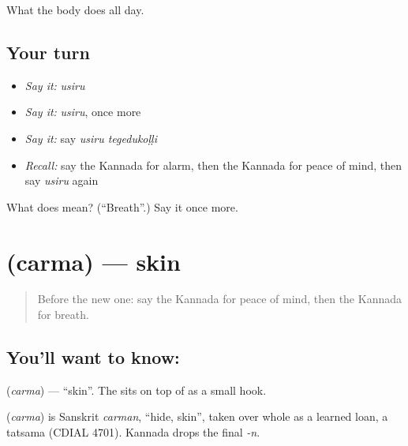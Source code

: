 \begin{grammarlens}[title={What you've built}]
What the body does all day.
\end{grammarlens}

\subsection*{Your turn}
\begin{itemize}
\raggedright
  \item \emph{Say it:} \emph{usiru}
  \item \emph{Say it:} \emph{usiru}, once more
  \item \emph{Say it:} say \emph{usiru tegedukoḷḷi}
  \item \emph{Recall:} say the Kannada for alarm, then the Kannada for peace of mind, then say \emph{usiru} again
\end{itemize}

\begin{tcolorbox}[breakable,colback=teal!4,colframe=teal!35!black,title={Before you move on}]
What does  mean? (\textquotedblleft{}Breath\textquotedblright{}.) Say it once more.
\end{tcolorbox}
\section[\texorpdfstring{\kn{ಚರ್ಮ} (carma)}{ಚರ್ಮ (carma)}]{ (carma) — skin}

\label{lesson:KA-C99-skin}



\begin{quote}
Before the new one: say the Kannada for peace of mind, then the Kannada for breath.
\end{quote}

\subsection*{You'll want to know: }
\textbf{} (\emph{carma}) — \textquotedblleft{}skin\textquotedblright{}. The \textbf{} sits on top of \textbf{} as a small hook.

\begin{cousinweb}
\textbf{} (\emph{carma}) is Sanskrit \emph{carman}, \textquotedblleft{}hide, skin\textquotedblright{}, taken over whole as a learned loan, a tatsama (CDIAL 4701). Kannada drops the final \emph{-n}.
\end{cousinweb}

